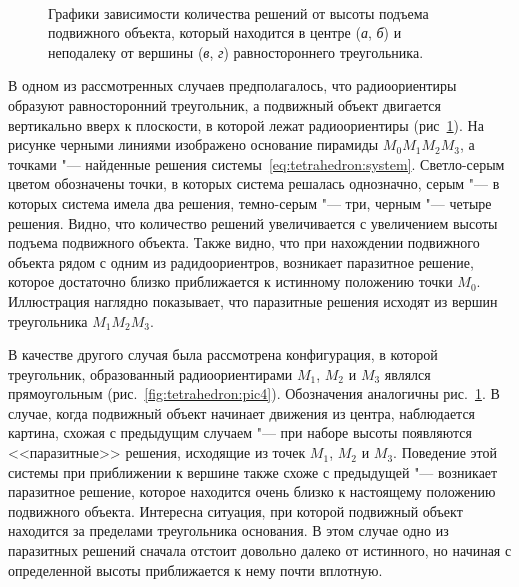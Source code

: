 \documentclass[../main.tex]{subfiles}
\begin{document}
\begin{figure}[hptb]
  \centering
  \qquad
  \\
  \qquad

  \caption{Графики зависимости количества решений от высоты подъема подвижного объекта, который находится в центре (\textit{а}, \textit{б}) и неподалеку от вершины (\textit{в}, \textit{г}) равностороннего треугольника.}
  \label{fig:tetrahedron:pic3}
\end{figure}

В одном из рассмотренных случаев предполагалось, что радиоориентиры образуют равносторонний треугольник, а подвижный объект двигается вертикально вверх к плоскости, в которой лежат радиоориентиры (рис~\ref{fig:tetrahedron:pic3}). На рисунке черными линиями изображено основание пирамиды $M_0 M_1 M_2 M_3$, а точками "--- найденные решения системы~\eqref{eq:tetrahedron:system}. Светло-серым цветом обозначены точки, в которых система решалась однозначно, серым "--- в которых система имела два решения, темно-серым "--- три, черным "--- четыре решения. Видно, что количество решений увеличивается с увеличением высоты подъема подвижного объекта. Также видно, что при нахождении подвижного объекта рядом с одним из радидоориентров, возникает паразитное решение, которое достаточно близко приближается к истинному положению точки $M_0$. Иллюстрация наглядно показывает, что паразитные решения исходят из вершин треугольника $M_1 M_2 M_3$.

В качестве другого случая была рассмотрена конфигурация, в которой треугольник, образованный радиоориентирами $M_1$, $M_2$ и $M_3$ являлся прямоугольным (рис.~\ref{fig:tetrahedron:pic4}). Обозначения аналогичны рис.~\ref{fig:tetrahedron:pic3}. В случае, когда подвижный объект начинает движения из центра, наблюдается картина, схожая с предыдущим случаем "--- при наборе высоты появляются <<паразитные>> решения, исходящие из точек $M_1$, $M_2$ и $M_3$. Поведение этой системы при приближении к вершине также схоже с предыдущей "--- возникает паразитное решение, которое находится очень близко к настоящему положению подвижного объекта. Интересна ситуация, при которой подвижный объект находится за пределами треугольника основания. В этом случае одно из паразитных решений сначала отстоит довольно далеко от истинного, но начиная с определенной высоты приближается к нему почти вплотную.
\end{document}
